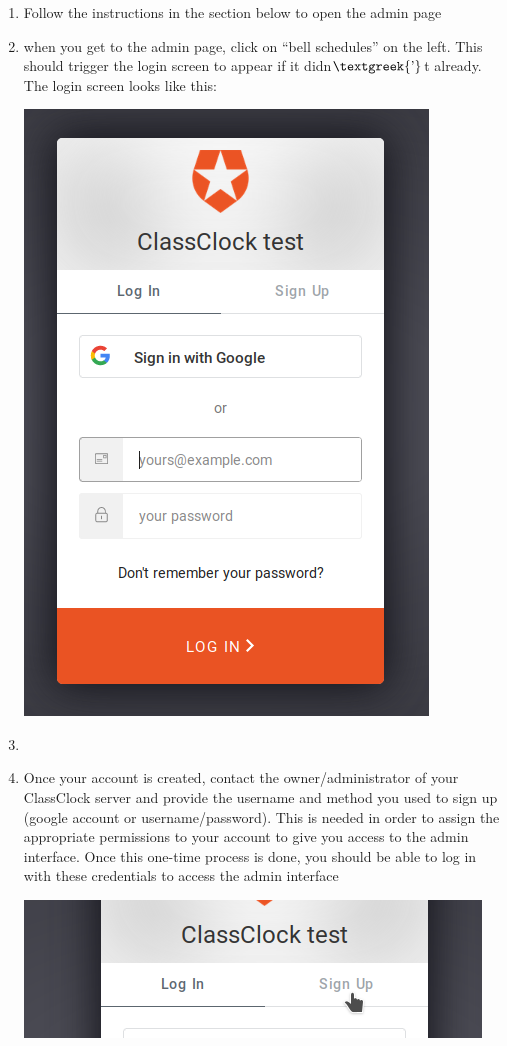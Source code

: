 \documentclass{article}
\begin{document}
\begin{enumerate}
\item {Follow the instructions in the section below to open the admin page}
\item {when you get to the admin page, click on “bell schedules” on the left. This should trigger the login screen to appear if
it didn$\text{\textgreek{’}}$t already. The login screen looks like this:\newline
}
\begin{center}
\includegraphics[width=4.2181in,height=6.322in]{Mini20Manual-img005.png}
\end{center}
\item {}
\item {Once your account is created, contact the owner/administrator of your ClassClock server and provide the username and
method you used to sign up (google account or username/password). This is needed in order to assign the appropriate
permissions to your account to give you access to the admin interface. Once this one-time process is done, you should
be able to log in with these credentials to access the admin interface}
\begin{center}
\includegraphics[width=4.7701in,height=1.4366in]{Mini20Manual-img006.png}
\end{center}
\end{enumerate}
\end{document}
